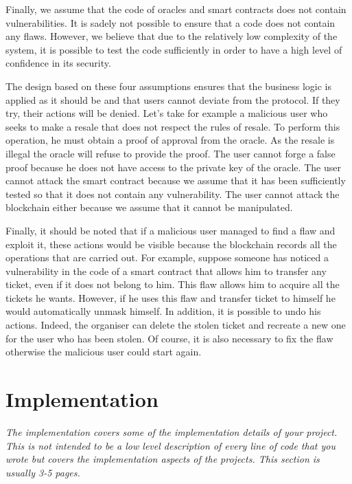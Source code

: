 \documentclass[a4paper,11pt,oneside]{report}
\begin{document}
Finally, we assume that the code of oracles and smart contracts does not contain vulnerabilities. It is sadely not possible to ensure that a code does not contain any flaws. However, we believe that due to the relatively low complexity of the system, it is possible to test the code sufficiently in order to have a high level of confidence in its security.

The design based on these four assumptions ensures that the business logic is applied as it should be and that users cannot deviate from the protocol. If they try, their actions will be denied. Let's take for example a malicious user who seeks to make a resale that does not respect the rules of resale. To perform this operation, he must obtain a proof of approval from the oracle. As the resale is illegal the oracle will refuse to provide the proof. The user cannot forge a false proof because he does not have access to the private key of the oracle. The user cannot attack the smart contract because we assume that it has been sufficiently tested so that it does not contain any vulnerability. The user cannot attack the blockchain either because we assume that it cannot be manipulated.

Finally, it should be noted that if a malicious user managed to find a flaw and exploit it, these actions would be visible because the blockchain records all the operations that are carried out. For example, suppose someone has noticed a vulnerability in the code of a smart contract that allows him to transfer any ticket, even if it does not belong to him. This flaw allows him to acquire all the tickets he wants. However, if he uses this flaw and transfer ticket to himself he would automatically unmask himself. In addition, it is possible to undo his actions. Indeed, the organiser can delete the stolen ticket and recreate a new one for the user who has been stolen. Of course, it is also necessary to fix the flaw otherwise the malicious user could start again.

\chapter{Implementation}

\textit{The implementation covers some of the implementation details of your project.
This is not intended to be a low level description of every line of code that
you wrote but covers the implementation aspects of the projects.
This section is usually 3-5 pages.} \\
\end{document}
